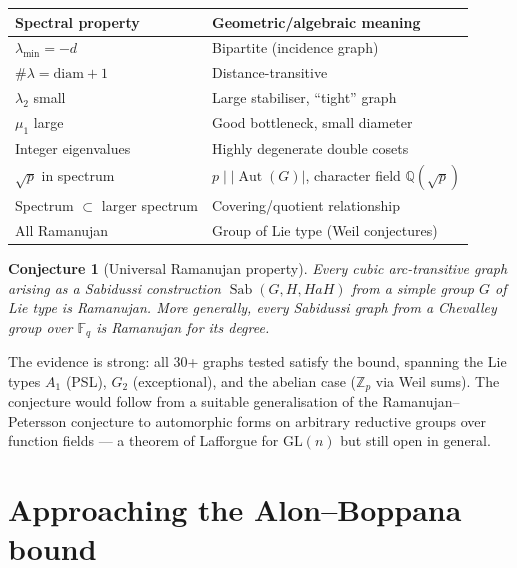 \documentclass[11pt,a4paper]{article}
\theoremstyle{plain}
\newtheorem{conjecture}[theorem]{Conjecture}
\theoremstyle{definition}
\theoremstyle{remark}
\newcommand{\Z}{\mathbb{Z}}
\newcommand{\Q}{\mathbb{Q}}
\newcommand{\F}{\mathbb{F}}
\newcommand{\Aut}{\operatorname{Aut}}
\newcommand{\Sab}{\operatorname{Sab}}
\begin{document}
\begin{tcolorbox}[breakable, colback=yellow!10, colframe=yellow!10,
  boxrule=0pt, sharp corners]
\begin{center}
\small
\begin{tabular}{@{}l l@{}}
\toprule
Spectral property & Geometric/algebraic meaning \\
\midrule
$\lambda_{\min} = -d$ & Bipartite (incidence graph) \\
$\#\lambda = \text{diam} + 1$ & Distance-transitive \\
$\lambda_2$ small & Large stabiliser, ``tight'' graph \\
$\mu_1$ large & Good bottleneck, small diameter \\
Integer eigenvalues & Highly degenerate double cosets \\
$\sqrt{p}$ in spectrum & $p \mid |\Aut(G)|$, character field $\Q(\sqrt{p})$ \\
Spectrum $\subset$ larger spectrum & Covering/quotient relationship \\
All Ramanujan & Group of Lie type (Weil conjectures) \\
\bottomrule
\end{tabular}
\end{center}
\end{tcolorbox}

\begin{tcolorbox}[breakable, colback=blue!5, colframe=blue!5,
  boxrule=0pt, sharp corners]
\begin{conjecture}[Universal Ramanujan property]
\label{conj:universal-ramanujan}
Every cubic arc-transitive graph arising as a Sabidussi construction
$\Sab(G, H, HaH)$ from a simple group $G$ of Lie type is Ramanujan.
More generally, every Sabidussi graph from a Chevalley group over
$\F_q$ is Ramanujan for its degree.
\end{conjecture}

The evidence is strong: all 30+ graphs tested satisfy the bound, spanning
the Lie types $A_1$ (PSL), $G_2$ (exceptional), and the abelian case
($\Z_p$ via Weil sums). The conjecture would follow from a suitable
generalisation of the Ramanujan--Petersson conjecture to automorphic forms
on arbitrary reductive groups over function fields --- a theorem of
Lafforgue for $\mathrm{GL}(n)$ but still open in general.
\end{tcolorbox}


\section{Approaching the Alon--Boppana bound}
\end{document}
